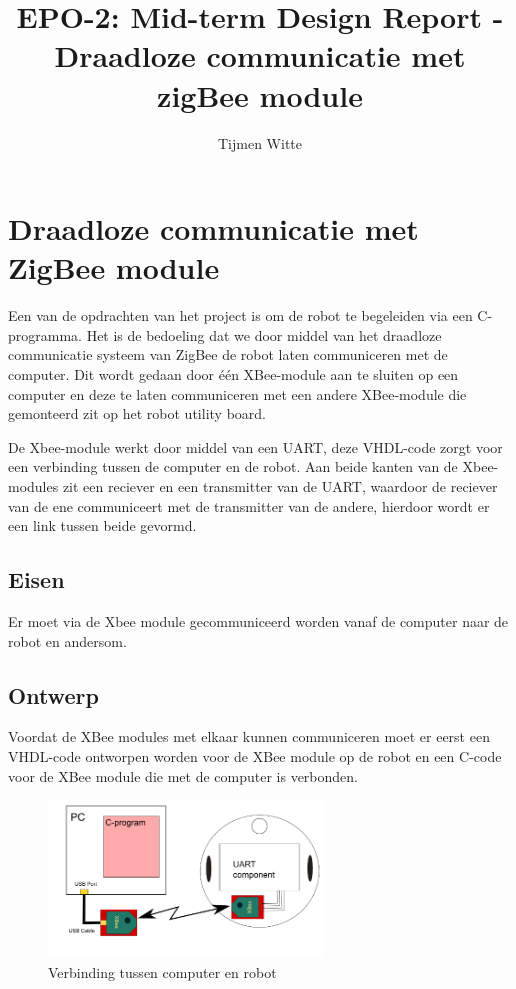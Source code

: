 \documentclass{report}
\title{EPO-2: Mid-term Design Report - Draadloze communicatie met zigBee module}
\author{Tijmen Witte}
\begin{document}
\chapter{Draadloze communicatie met ZigBee module}
\label{ch:zigbee}

Een van de opdrachten van het project is om de robot te begeleiden via een C-programma.
Het is de bedoeling dat we door middel van het draadloze communicatie systeem van ZigBee de robot laten communiceren met de computer.
Dit wordt gedaan door één XBee-module aan te sluiten op een computer en deze te laten communiceren met een andere XBee-module die gemonteerd zit op het robot utility board.

De Xbee-module werkt door middel van een UART, deze VHDL-code zorgt voor een verbinding tussen de computer en de robot. Aan beide kanten van de Xbee-modules zit een reciever en een transmitter van de UART, waardoor de reciever van de ene communiceert met de transmitter van de andere, hierdoor wordt er een link tussen beide gevormd.


\section{Eisen}

Er moet via de Xbee module gecommuniceerd worden vanaf de computer naar de robot en andersom.


\section{Ontwerp}
Voordat de XBee modules met elkaar kunnen communiceren moet er eerst een VHDL-code ontworpen worden voor de XBee module op de robot en een C-code voor de XBee module die met de computer is verbonden.


\begin{figure}[H]
	\centering
	\includegraphics[width=0.65\textwidth]{zigbee.png}
	\caption{Verbinding tussen computer en robot}
	\label{fig:zigbee}
\end{figure}
\end{document}
